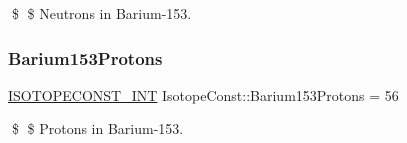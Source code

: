 \$ \$ Neutrons in Barium-\/153. \mbox{\label{group___isotope_const-_barium-_ba153_gac85cbd135b616425745bfa8bd350f072}} 
\subsubsection{\texorpdfstring{Barium153\+Protons}{Barium153Protons}}
{\footnotesize\ttfamily \mbox{\hyperlink{group___isotope_const-_macros_ga5f18360b3e99483a35c32d789e62621c}{I\+S\+O\+T\+O\+P\+E\+C\+O\+N\+S\+T\+\_\+\+I\+NT}} Isotope\+Const\+::\+Barium153\+Protons = 56}

\$ \$ Protons in Barium-\/153. 